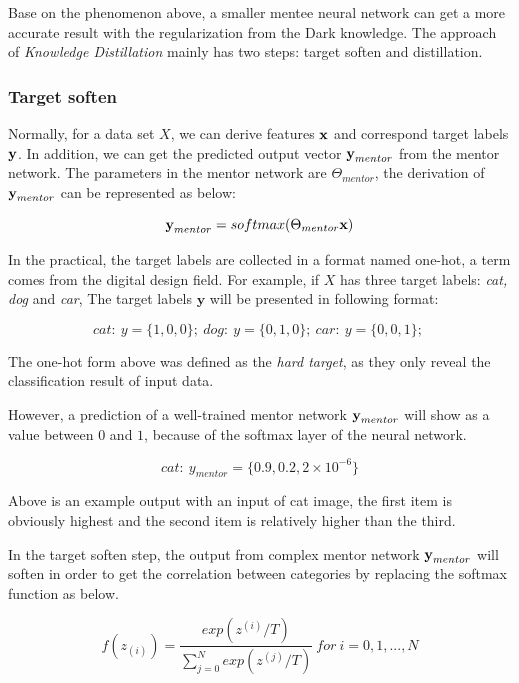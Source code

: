 \documentclass[article]{aaltoseries}
\begin{document}
Base on the phenomenon above, a smaller mentee neural network can get a more accurate result with the regularization from
the Dark knowledge. 
The approach of \emph{Knowledge Distillation} mainly has two steps: target soften and distillation.

\subsubsection{Target soften}

Normally, for a data set \(X\), we can derive features \(\textbf x \) and correspond target labels \(\textbf y\).
In addition, we can get the predicted output vector \(\textbf y_{mentor}\) from the mentor network.
The parameters in the mentor network are \(\Theta_{mentor}\), 
the derivation of \(\textbf y_{mentor}\) can be represented as below:

\[
  \textbf y_{mentor} = softmax(\Theta_{mentor} \textbf{x})
\]

In the practical, the target labels are collected in a format named one-hot, a term comes from the digital
design field\cite{DigitalDesign}. For example, if \(X\) has three target labels: \emph{cat, dog} and \emph{car},
The target labels \(\textbf{y}\) will be presented in following format:

\[
  cat:\ y = \{1,0,0\};\ 
  dog:\ y = \{0,1,0\};\ 
  car:\ y = \{0,0,1\};\ 
\]

The one-hot form above was defined as the \emph{hard target}, as they only reveal the classification result of input data.

However, a prediction of a well-trained mentor network \(\textbf y_{mentor}\) will show as a value between 
\(0\) and \(1\), because of the softmax layer of the neural network. 

\begin{equation} \label{eq:cat_example}
  cat:\ y_{mentor} = \{0.9,0.2,2 \times 10^{-6}\}
\end{equation}

Above is an example output with an input of cat image, 
the first item is obviously highest and the second item is relatively higher than the third.


In the target soften step, 
the output from complex mentor network \(\textbf y_{mentor}\) will soften in order to get the correlation between categories
by replacing the softmax function as below.

\begin{equation} \label{eq:new_soft_max}
  f(z_{(i)}) = \frac{exp(z^{(i)}/T)}{\sum_{j=0}^{N}exp(z^{(j)}/T)}\ for\ i=0,1,...,N
\end{equation}
\end{document}
